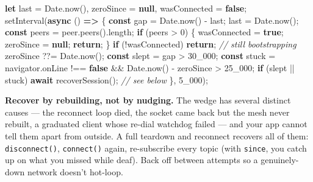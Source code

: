 \documentclass[
  nobib]{tufte-handout}
\newenvironment{Shaded}{}{}
\newcommand{\AttributeTok}[1]{\textcolor[rgb]{0.49,0.56,0.16}{#1}}
\newcommand{\BuiltInTok}[1]{\textcolor[rgb]{0.00,0.50,0.00}{#1}}
\newcommand{\CommentTok}[1]{\textcolor[rgb]{0.38,0.63,0.69}{\textit{#1}}}
\newcommand{\ControlFlowTok}[1]{\textcolor[rgb]{0.00,0.44,0.13}{\textbf{#1}}}
\newcommand{\DecValTok}[1]{\textcolor[rgb]{0.25,0.63,0.44}{#1}}
\newcommand{\FunctionTok}[1]{\textcolor[rgb]{0.02,0.16,0.49}{#1}}
\newcommand{\KeywordTok}[1]{\textcolor[rgb]{0.00,0.44,0.13}{\textbf{#1}}}
\newcommand{\NormalTok}[1]{#1}
\newcommand{\OperatorTok}[1]{\textcolor[rgb]{0.40,0.40,0.40}{#1}}
\newcommand{\PreprocessorTok}[1]{\textcolor[rgb]{0.74,0.48,0.00}{#1}}
\begin{document}
\begin{Shaded}
\begin{Highlighting}[]
\KeywordTok{let}\NormalTok{ last }\OperatorTok{=} \BuiltInTok{Date}\OperatorTok{.}\FunctionTok{now}\NormalTok{()}\OperatorTok{,}\NormalTok{ zeroSince }\OperatorTok{=} \KeywordTok{null}\OperatorTok{,}\NormalTok{ wasConnected }\OperatorTok{=} \KeywordTok{false}\OperatorTok{;}
\PreprocessorTok{setInterval}\NormalTok{(}\KeywordTok{async}\NormalTok{ () }\KeywordTok{=\textgreater{}}\NormalTok{ \{}
  \KeywordTok{const}\NormalTok{ gap }\OperatorTok{=} \BuiltInTok{Date}\OperatorTok{.}\FunctionTok{now}\NormalTok{() }\OperatorTok{{-}}\NormalTok{ last}\OperatorTok{;}\NormalTok{ last }\OperatorTok{=} \BuiltInTok{Date}\OperatorTok{.}\FunctionTok{now}\NormalTok{()}\OperatorTok{;}
  \KeywordTok{const}\NormalTok{ peers }\OperatorTok{=}\NormalTok{ peer}\OperatorTok{.}\FunctionTok{peers}\NormalTok{()}\OperatorTok{.}\AttributeTok{length}\OperatorTok{;}
  \ControlFlowTok{if}\NormalTok{ (peers }\OperatorTok{\textgreater{}} \DecValTok{0}\NormalTok{) \{ wasConnected }\OperatorTok{=} \KeywordTok{true}\OperatorTok{;}\NormalTok{ zeroSince }\OperatorTok{=} \KeywordTok{null}\OperatorTok{;} \ControlFlowTok{return}\OperatorTok{;}\NormalTok{ \}}
  \ControlFlowTok{if}\NormalTok{ (}\OperatorTok{!}\NormalTok{wasConnected) }\ControlFlowTok{return}\OperatorTok{;}                    \CommentTok{// still bootstrapping}
\NormalTok{  zeroSince }\OperatorTok{??=} \BuiltInTok{Date}\OperatorTok{.}\FunctionTok{now}\NormalTok{()}\OperatorTok{;}
  \KeywordTok{const}\NormalTok{ slept }\OperatorTok{=}\NormalTok{ gap }\OperatorTok{\textgreater{}} \DecValTok{30\_000}\OperatorTok{;}
  \KeywordTok{const}\NormalTok{ stuck }\OperatorTok{=} \BuiltInTok{navigator}\OperatorTok{.}\AttributeTok{onLine} \OperatorTok{!==} \KeywordTok{false} \OperatorTok{\&\&} \BuiltInTok{Date}\OperatorTok{.}\FunctionTok{now}\NormalTok{() }\OperatorTok{{-}}\NormalTok{ zeroSince }\OperatorTok{\textgreater{}} \DecValTok{25\_000}\OperatorTok{;}
  \ControlFlowTok{if}\NormalTok{ (slept }\OperatorTok{||}\NormalTok{ stuck) }\ControlFlowTok{await} \FunctionTok{recoverSession}\NormalTok{()}\OperatorTok{;}   \CommentTok{// see below}
\NormalTok{\}}\OperatorTok{,} \DecValTok{5\_000}\NormalTok{)}\OperatorTok{;}
\end{Highlighting}
\end{Shaded}

\textbf{Recover by rebuilding, not by nudging.} The wedge has several
distinct causes --- the reconnect loop died, the socket came back but
the mesh never rebuilt, a graduated client whose re-dial watchdog failed
--- and your app cannot tell them apart from outside. A full teardown
and reconnect recovers all of them: \texttt{disconnect()},
\texttt{connect()} again, re-subscribe every topic (with \texttt{since},
you catch up on what you missed while deaf). Back off between attempts
so a genuinely-down network doesn't hot-loop.
\end{document}
